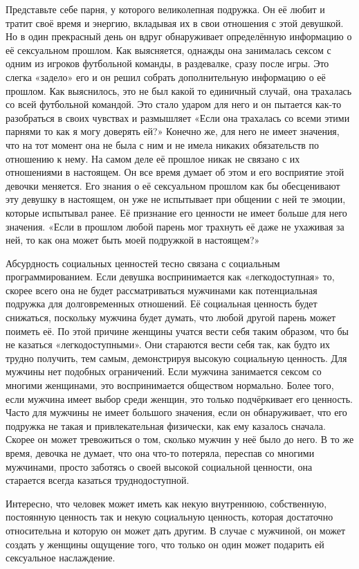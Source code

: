 Представьте себе парня, у которого великолепная подружка. Он её любит и тратит своё время и энергию, вкладывая их в свои отношения с этой девушкой. Но в один прекрасный день он вдруг обнаруживает определённую информацию о её сексуальном прошлом. Как выясняется, однажды она занималась сексом с одним из игроков футбольной команды, в раздевалке, сразу после игры. Это слегка «задело» его и он решил собрать дополнительную информацию о её прошлом. Как выяснилось, это не был какой то единичный случай, она трахалась со всей футбольной командой. Это стало ударом для него и он пытается как-то разобраться в своих чувствах и размышляет «Если она трахалась со всеми этими парнями то как я могу доверять ей?» Конечно же, для него не имеет значения, что на тот момент она не была с ним и не имела никаких обязательств по отношению к нему. На самом деле её прошлое никак не связано с их отношениями в настоящем. Он все время думает об этом и его восприятие этой девочки меняется. Его знания о её сексуальном прошлом как бы обесценивают эту девушку в настоящем, он уже не испытывает при общении с ней те эмоции, которые испытывал ранее. Её признание его ценности не имеет больше для него значения. «Если в прошлом любой парень мог трахнуть её даже не ухаживая за ней, то как она может быть моей подружкой в настоящем?»

Абсурдность социальных ценностей тесно связана с социальным программированием. Если девушка воспринимается как «легкодоступная» то, скорее всего она не будет рассматриваться мужчинами как потенциальная подружка для долговременных отношений. Её социальная ценность будет снижаться, поскольку мужчина будет думать, что любой другой парень может поиметь её. По этой причине женщины учатся вести себя таким образом, что бы не казаться «легкодоступными». Они стараются вести себя так, как будто их трудно получить, тем самым, демонстрируя высокую социальную ценность. Для мужчины нет подобных ограничений. Если мужчина занимается сексом со многими женщинами, это воспринимается обществом нормально. Более того, если мужчина имеет выбор среди женщин, это только подчёркивает его ценность. Часто для мужчины не имеет большого значения, если он обнаруживает, что его подружка не такая и привлекательная физически, как ему казалось сначала. Скорее он может тревожиться о том, сколько мужчин у неё было до него. В то же время, девочка не думает, что она что-то потеряла, переспав со многими мужчинами, просто заботясь о своей высокой социальной ценности, она старается всегда казаться труднодоступной.

Интересно, что человек может иметь как некую внутреннюю, собственную, постоянную ценность так и некую социальную ценность, которая достаточно относительна и которую он может дать другим. В случае с мужчиной, он может создать у женщины ощущение того, что только он один может подарить ей сексуальное наслаждение.

